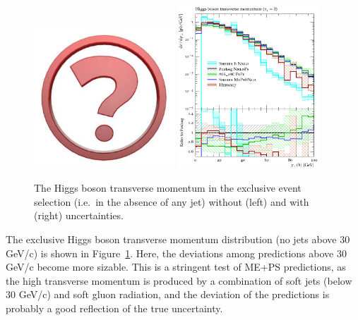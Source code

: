 \begin{figure}[t!]
  \centering
  \includegraphics[width=0.47\textwidth]{Micon.pdf}
  \hfill
  \includegraphics[width=0.47\textwidth]{figures/hjetscomp_H_pT_excl.pdf}
  \caption{
    The Higgs boson transverse momentum in the exclusive event
    selection (i.e.~in the absence of any jet) without (left) and with
    (right) uncertainties.
    \label{fig:higgscomp:results:exclobs:hpt}
  }
\end{figure}

The exclusive Higgs boson transverse momentum distribution (no jets
above 30 GeV/c) is shown in
Figure~\ref{fig:higgscomp:results:exclobs:hpt}. Here, the deviations
among predictions above 30 GeV/c become more sizable. This is a
stringent test of ME+PS predictions, as the high transverse momentum
is produced by a combination of soft jets (below 30 GeV/c) and soft
gluon radiation, and the deviation of the predictions is probably a
good reflection of the true uncertainty.

